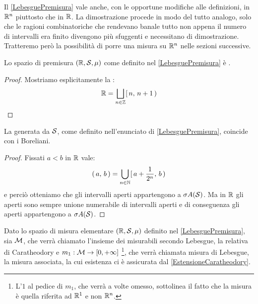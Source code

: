 \begin{remark}
	Il \cref{LebesguePremisura} vale anche, con le opportune modifiche alle definizioni, in $\R^n$ piuttosto che in $\R$. La dimostrazione procede in modo del tutto analogo, solo che le ragioni combinatoriche che rendevano banale tutto non appena il numero di intervalli era finito divengono più sfuggenti e necessitano di dimostrazione. Tratteremo però la possibilità di porre una misura su $\R^n$ nelle sezioni successive.
\end{remark}

\begin{proposition}\label{LebesguePremisuraSigFin}
	Lo spazio di premisura $(\R,\S,\mu)$ come definito nel \cref{LebesguePremisura} è \sigfin[o].
\end{proposition}
\begin{proof}
	Mostriamo esplicitamente la \sigfin[ezza]:
	\begin{equation*}
		\R=\bigsqcup_{n\in\mathbb Z} \so{n}{n+1}
	\end{equation*}
\end{proof}

\begin{proposition}\label{SigAlgUgualeBoreliani}
	La \sigalg{} generata da $\S$, come definito nell'enunciato di \cref{LebesguePremisura}, coincide con i Boreliani.
\end{proposition}
\begin{proof}
	Fissati $a<b$ in $\R$ vale:
	\begin{equation*}
		\oo{a}{b}=\bigcup_{n\in\N}\so{a+\frac1{2^n}}b
	\end{equation*}
	e perciò otteniamo che gli intervalli aperti appartengono a $\sigma A(\S)$.
	Ma in $\R$ gli aperti sono sempre unione numerabile di intervalli aperti e di conseguenza gli aperti appartengono a $\sigma A(\S)$.
\end{proof}



\begin{definition}\label{LebesgueMisura}
	Dato lo spazio di misura elementare $(\R,\S,\mu)$ definito nel \cref{LebesguePremisura}, sia $\M$, che verrà chiamato l'insieme dei misurabili secondo Lebesgue, la relativa \sigalg{} di Caratheodory e $m_1:\M\to\Rpiu$ \footnote{L'$1$ al pedice di $m_1$, che verrà a volte omesso, sottolinea il fatto che la misura è quella riferita ad $\R^1$ e non $\R^n$.}, che verrà chiamata misura di Lebesgue, la misura associata, la cui esistenza ci è assicurata dal \cref{EstensioneCaratheodory}.
\end{definition}

